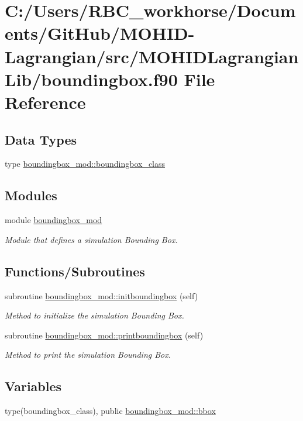 \hypertarget{boundingbox_8f90}{}\section{C\+:/\+Users/\+R\+B\+C\+\_\+workhorse/\+Documents/\+Git\+Hub/\+M\+O\+H\+I\+D-\/\+Lagrangian/src/\+M\+O\+H\+I\+D\+Lagrangian\+Lib/boundingbox.f90 File Reference}
\label{boundingbox_8f90}
\subsection*{Data Types}
\begin{DoxyCompactItemize}
\item 
type \mbox{\hyperlink{structboundingbox__mod_1_1boundingbox__class}{boundingbox\+\_\+mod\+::boundingbox\+\_\+class}}
\end{DoxyCompactItemize}
\subsection*{Modules}
\begin{DoxyCompactItemize}
\item 
module \mbox{\hyperlink{namespaceboundingbox__mod}{boundingbox\+\_\+mod}}
\begin{DoxyCompactList}\small\item\em Module that defines a simulation Bounding Box. \end{DoxyCompactList}\end{DoxyCompactItemize}
\subsection*{Functions/\+Subroutines}
\begin{DoxyCompactItemize}
\item 
subroutine \mbox{\hyperlink{namespaceboundingbox__mod_a35e41bb92c19802441dd8d748c3acfb4}{boundingbox\+\_\+mod\+::initboundingbox}} (self)
\begin{DoxyCompactList}\small\item\em Method to initialize the simulation Bounding Box. \end{DoxyCompactList}\item 
subroutine \mbox{\hyperlink{namespaceboundingbox__mod_a6ec461b758bc180dc72b5fb23169feca}{boundingbox\+\_\+mod\+::printboundingbox}} (self)
\begin{DoxyCompactList}\small\item\em Method to print the simulation Bounding Box. \end{DoxyCompactList}\end{DoxyCompactItemize}
\subsection*{Variables}
\begin{DoxyCompactItemize}
\item 
type(boundingbox\+\_\+class), public \mbox{\hyperlink{namespaceboundingbox__mod_a45e98e492bb546328c98f618a74622ec}{boundingbox\+\_\+mod\+::bbox}}
\end{DoxyCompactItemize}
